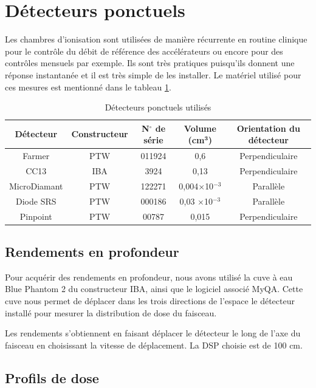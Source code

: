 \documentclass{book}
\begin{document}
\section{Détecteurs ponctuels}

Les chambres d'ionisation sont utilisées de manière récurrente en routine clinique pour le contrôle du débit de référence des accélérateurs ou encore pour des contrôles mensuels par exemple. Ils sont très pratiques puisqu'ils donnent une réponse instantanée et il est très simple de les installer. Le matériel utilisé pour ces mesures est mentionné dans le tableau \ref*{table_detecteurs_ponctuels}.

\begin{table}[h]
  \centering
  \begin{tabular}{ccccc}
    \toprule
    \textbf{Détecteur} & \textbf{Constructeur} &  \textbf{N}$\mathbf{^{\circ}}$ \textbf{de série} & \textbf{Volume (cm}$\mathbf{^3}$\textbf{)} & \textbf{Orientation du détecteur}\\
    \toprule
    Farmer & PTW & 011924 & 0,6 & Perpendiculaire \\
    CC13 & IBA & 3924 & 0,13 & Perpendiculaire \\
    MicroDiamant & PTW & 122271 & 0,004$\times$10$^{-3}$ & Parallèle \\
    Diode SRS & PTW & 000186 & 0,03 $\times$10$^{-3}$ & Parallèle \\
    Pinpoint & PTW & 00787 & 0,015 & Perpendiculaire \\
    \bottomrule
  \end{tabular}
  \caption{Détecteurs ponctuels utilisés}
  \label{table_detecteurs_ponctuels}
\end{table}

\subsection{Rendements en profondeur}

Pour acquérir des rendements en profondeur, nous avons utilisé la cuve à eau Blue Phantom 2 du constructeur IBA, ainsi que le logiciel associé MyQA. Cette cuve nous permet de déplacer dans les trois directions de l'espace le détecteur installé pour mesurer la distribution de dose du faisceau.

Les rendements s'obtiennent en faisant déplacer le détecteur le long de l'axe du faisceau en choisissant la vitesse de déplacement. La DSP choisie est de 100 cm.

\subsection{Profils de dose}
\end{document}
